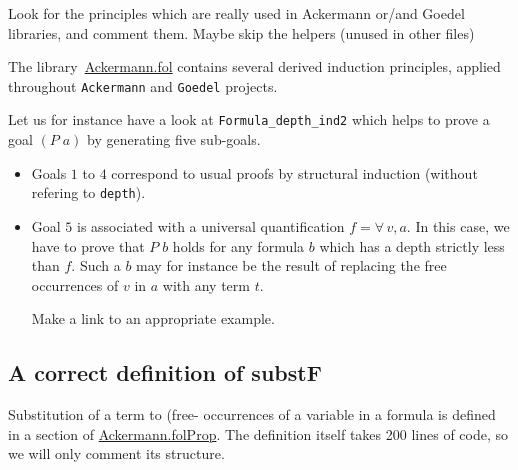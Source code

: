 



\begin{todo}
 Look for the principles which are really used in Ackermann or/and Goedel libraries, and comment them.
 Maybe skip the helpers (unused in other files)
\end{todo}

The library~\href{../theories/html/hydras.Ackermann.fol.html}{Ackermann.fol} contains several derived induction principles, applied 
throughout \texttt{Ackermann} and \texttt{Goedel} projects.


Let us for instance have a look  at \texttt{Formula\_depth\_ind2} which helps  to prove a goal $(P\;a)$ by generating five sub-goals.


\begin{itemize}
\item Goals $1$ to $4$ correspond to  usual proofs by structural induction (without refering to \texttt{depth}).
\item Goal $5$ is associated with a universal quantification $f=\forall\,v,a$. In this case, we have to prove that $P\;b$ holds for any formula $b$ which has a depth strictly less than $f$. Such a $b$ may for instance be the result of replacing the free occurrences of $v$ in $a$ with any term $t$.
  
  \begin{todo}
   Make a link to an appropriate example.
  \end{todo}
\end{itemize}



\subsection{A correct definition of substF}

Substitution of a term to (free- occurrences of a variable 
in a formula is defined in a section of \href{../theories/html/hydras.Ackermann.folProp.html}{Ackermann.folProp}.
The definition itself takes 200 lines of \coq code, so we will only comment its structure.

